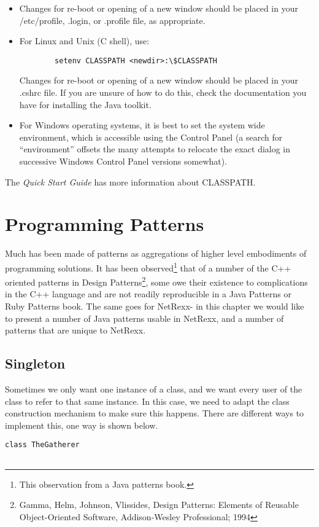 {\begin{itemize}
\item Changes for re-boot or opening of a new window should be placed in your /etc/profile, .login, or .profile file, as appropriate. 
\item For Linux and Unix (C shell), use:
\begin{verbatim}
        setenv CLASSPATH <newdir>:\$CLASSPATH 
\end{verbatim}
Changes for re-boot or opening of a new window should be placed in
your .cshrc file. If you are unsure of how to do this, check the
documentation you have for installing the Java toolkit.
\item For Windows operating systems, it is best to set the system wide
  environment, which is accessible using the Control Panel (a search
  for ``environment'' offsets the many attempts to relocate the exact
  dialog in successive Windows Control Panel versions somewhat).
\end{itemize}
The \emph{Quick Start Guide} has more information about CLASSPATH.

\chapter{Programming Patterns}
Much has been made of patterns as aggregations of higher level
embodiments of programming solutions.  It has been
observed\footnote{This observation from a Java patterns book.} that of a
number of the C++ oriented patterns in Design Patterns\footnote{Gamma,
Helm, Johnson, Vlissides, Design
Patterns: Elements of Reusable Object-Oriented Software,
Addison-Wesley Professional; 1994}, some owe their existence
to complications in the C++ language and are not readily reproducible
in a Java Patterns or Ruby Patterns book. The same goes for NetRexx-
in this chapter we would like to present a number of Java patterns
usable in NetRexx, and a number of patterns that are unique to
NetRexx.

\section{Singleton}\label{singleton}
Sometimes we only want one instance of a class, and we want every user
of the class to refer to that same instance. In this case, we need to
adapt the class construction mechanism to make sure this
happens. There are different ways to implement this, one way is shown
below.
\begin{lstlisting}[label=singleton1,caption=Singleton]
class TheGatherer


\end{lstlisting}}
